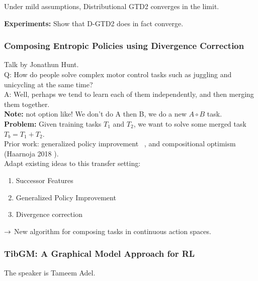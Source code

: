 \begin{theorem}
Under mild assumptions, Distributional GTD2 converges in the limit.
\end{theorem}

{\bf Experiments:} Show that D-GTD2 does in fact converge.

\spacerule

\subsubsection{Composing Entropic Policies using Divergence Correction}

Talk by Jonathun Hunt. \\

Q: How do people solve complex motor control tasks such as juggling and unicycling at the same time? \\

A: Well, perhaps we tend to learn each of them independently, and then merging them together. \\

{\bf Note:} not option like! We don't do A then B, we do a new $A \circ B$ task. \\

{\bf Problem:} Given training tasks $T_1$ and $T_2$, we want to solve some merged task $T_b = T_1 + T_2$. \\

Prior work: generalized policy improvement~\cite{barreto} , and compositional optimism (Haarnoja 2018 ). \\

Adapt existing ideas to this transfer setting:
\begin{enumerate}
    \item Successor Features
    \item Generalized Policy Improvement
    \item Divergence correction
\end{enumerate}

$\rightarrow$ New algorithm for composing tasks in continuous action spaces. \\

\spacerule

\subsubsection{TibGM: A Graphical Model Approach for RL}

The speaker is Tameem Adel. \\

